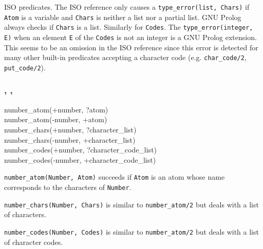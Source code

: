 \Portability

ISO predicates. The ISO reference only causes a \texttt{type\_error(list,
Chars)} if \texttt{Atom} is a variable and \texttt{Chars} is neither a list
nor a partial list. GNU Prolog always checks if \texttt{Chars} is a list.
Similarly for \texttt{Codes}. The \texttt{type\_error(integer, E)} when an
element \texttt{E} of the \texttt{Codes} is not an integer is a GNU Prolog
extension. This seems to be an omission in the ISO reference since this
error is detected for many other built-in predicates accepting a character
code (e.g. \texttt{char\_code/2}, \texttt{put\_code/2}).

\subsubsection{,\label{number-atom/2}
               ,
               }


\begin{TemplatesOneCol}
number\_atom(+number, ?atom)\\
number\_atom(-number, +atom)\\
number\_chars(+number, ?character\_list)\\
number\_chars(-number, +character\_list)\\
number\_codes(+number, ?character\_code\_list)\\
number\_codes(-number, +character\_code\_list)

\end{TemplatesOneCol}

\Description

\texttt{number\_atom(Number, Atom)} succeeds if
\texttt{Atom} is an atom whose name corresponds to the characters of
\texttt{Number}.

\texttt{number\_chars(Number, Chars)} is similar to
\texttt{number\_atom/2} but deals with a list of characters.

\texttt{number\_codes(Number, Codes)} is similar to
\texttt{number\_atom/2} but deals with a list of character codes.

